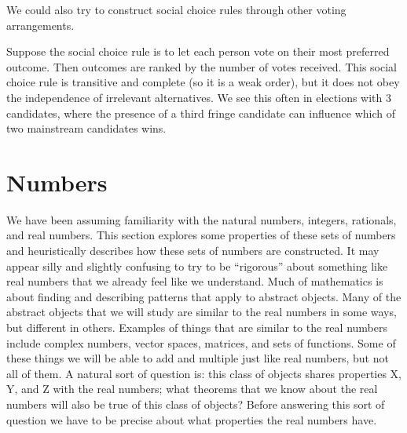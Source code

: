 We could also try to construct social choice rules through other
voting arrangements. 
\begin{example}
  Suppose the social choice rule is to let each person vote on their
  most preferred outcome. Then outcomes are ranked by the number of
  votes received. This social choice rule is transitive and complete
  (so it is a weak order), but it does not obey the independence of
  irrelevant alternatives. We see this often in elections with 3
  candidates, where the presence of a third fringe candidate can
  influence which of two mainstream candidates wins.
\end{example}



\appendix
\section{Numbers \label{s:numbers}}

We have been assuming familiarity with the natural numbers, integers,
rationals, and real numbers. This section explores some properties of
these sets of numbers and heuristically describes how these sets of
numbers are constructed. It may appear silly and slightly confusing to
try to be ``rigorous'' about something like real numbers that we
already feel like we understand.  Much of mathematics is about finding
and describing patterns that apply to abstract objects. Many of the
abstract objects that we will study are similar to the real numbers in
some ways, but different in others. Examples of things that are
similar to the real numbers include complex numbers, vector spaces,
matrices, and sets of functions. Some of these things we will be able
to add and multiple just like real numbers, but not all of them. A
natural sort of question is: this class of objects shares properties
X, Y, and Z with the real numbers; what theorems that we know about
the real numbers will also be true of this class of objects? Before
answering this sort of question we have to be precise about what
properties the real numbers have.

